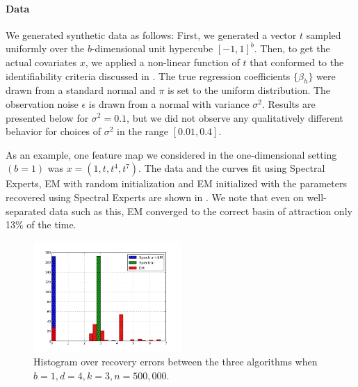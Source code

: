 \paragraph{Data}

We generated synthetic data as follows:
First, we generated a vector $t$ sampled uniformly over the $b$-dimensional
unit hypercube $[-1,1]^b$.
Then, to get the actual covariates $x$, we applied a non-linear function of $t$
that conformed to the identifiability criteria discussed in
.
The true regression coefficients $\{\beta_h\}$ were drawn from a standard normal
and $\pi$ is set to the uniform distribution.
The observation noise $\epsilon$ is drawn from a normal with variance $\sigma^2$.
Results are presented below for $\sigma^2 = 0.1$, but we did not observe any
qualitatively different behavior for choices of $\sigma^2$ in the range
$[0.01, 0.4]$.  

As an example, one feature map we considered in the one-dimensional
setting $(b=1)$ was $x = (1, t, t^4, t^7)$. The data and the curves fit using
Spectral Experts, EM with random initialization and EM initialized with
the parameters recovered using Spectral Experts are shown in
. We note that even on well-separated data such as
this, EM converged to the correct basin of attraction only 13\% of the time.

\begin{figure}[t]
  \centering
  \includegraphics[width=0.50\textwidth]{figures/hist.png}
  \caption{Histogram over recovery errors between the three algorithms when $b = 1, d = 4, k = 3, n = 500,000$.}
  \label{fig:hist}
\end{figure}


